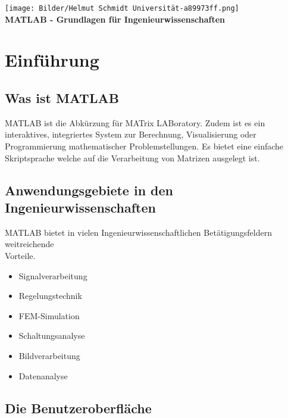 \documentclass[12pt, a4paper, twoside]{article}
\begin{document}
    \thispagestyle{empty}
     \vspace*{4cm}
    \begin{center}
        \texttt{[image: Bilder/Helmut Schmidt Universität-a89973ff.png]}\\
        \vspace{2cm}
        \huge\textbf{MATLAB - Grundlagen für Ingenieurwissenschaften}
    \end{center}
    \newpage

    \renewcommand{\contentsname}{Inhaltsverzeichnis}
    \tableofcontents
    \newpage
    \section{Einführung}
        \subsection{Was ist MATLAB}
        MATLAB ist die Abkürzung für MATrix LABoratory. Zudem ist es ein interaktives, integriertes System zur Berechnung, Visualisierung oder Programmierung mathematischer Problemstellungen. Es bietet eine einfache Skriptsprache welche auf die Verarbeitung von Matrizen ausgelegt ist.
        \subsection{Anwendungsgebiete in den Ingenieurwissenschaften}
        MATLAB bietet in vielen Ingenieurwissenschaftlichen Betätigungsfeldern weitreichende \\Vorteile.
        \begin{itemize}
            \item Signalverarbeitung
            \item Regelungstechnik
            \item FEM-Simulation
            \item Schaltungsanalyse
            \item Bildverarbeitung
            \item Datenanalyse
        \end{itemize}
        \subsection{Die Benutzeroberfläche}
\end{document}
